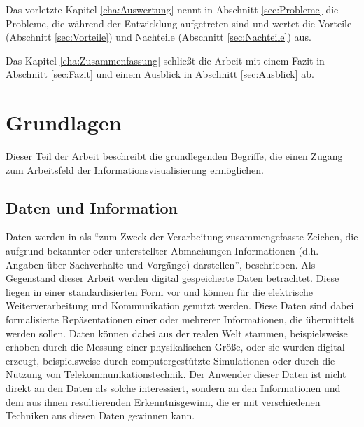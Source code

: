 \documentclass[a4paper, 12pt, DIVcalc, onepage, pdftex, headsepline, footsepline]{scrreprt}
\begin{document}
Das vorletzte Kapitel \ref{cha:Auswertung} nennt in Abschnitt \ref{sec:Probleme} die Probleme, die während
der Entwicklung aufgetreten sind und wertet die Vorteile (Abschnitt \ref{sec:Vorteile}) und Nachteile
(Abschnitt \ref{sec:Nachteile}) aus.

Das Kapitel \ref{cha:Zusammenfassung} schließt die Arbeit mit einem Fazit in Abschnitt \ref{sec:Fazit} und
einem Ausblick in Abschnitt \ref{sec:Ausblick} ab.

\chapter{Grundlagen}
\label{cha:Grundlagen}
Dieser Teil der Arbeit beschreibt die grundlegenden Begriffe, die einen Zugang
zum Arbeitsfeld der Informationsvisualisierung ermöglichen.
\section{Daten und Information}
\label{sec:DatenInfo}
Daten werden in \citep{Gabler} als "`zum Zweck der Verarbeitung zusammengefasste Zeichen,
die aufgrund bekannter oder unterstellter Abmachungen
Informationen (d.h. Angaben über Sachverhalte und Vorgänge) darstellen"', beschrieben.
Als Gegenstand dieser Arbeit werden digital gespeicherte Daten betrachtet.
Diese liegen in einer standardisierten Form vor und können für die elektrische Weiterverarbeitung
und Kommunikation genutzt werden. Diese Daten sind dabei formalisierte Repäsentationen einer
oder mehrerer Informationen, die übermittelt werden sollen.
Daten können dabei aus der realen Welt stammen, beispielsweise erhoben durch
die Messung einer physikalischen Größe, oder sie wurden digital erzeugt, beispielsweise durch
computergestützte Simulationen oder durch die Nutzung von Telekommunikationstechnik.
Der Anwender dieser Daten ist nicht direkt an den Daten als solche interessiert, sondern
an den Informationen und dem aus ihnen resultierenden Erkenntnisgewinn, die er mit verschiedenen
Techniken aus diesen Daten gewinnen kann.
\end{document}
